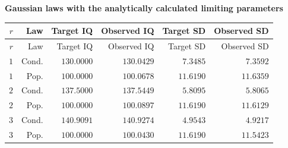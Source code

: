 
\begingroup\small
\setlength{\tabcolsep}{4pt}
\noindent\textbf{Gaussian laws with the analytically calculated limiting parameters}
\begin{longtable}{rrrrrr}
\toprule
$r$ & Law & Target IQ & Observed IQ & Target SD & Observed SD \\
\midrule
\endfirsthead
$r$ & Law & Target IQ & Observed IQ & Target SD & Observed SD \\
\midrule
\endhead
\bottomrule
\endfoot
$1$ & Cond. & $130.0000$ & $130.0429$ & $7.3485$ & $7.3592$ \\
$1$ & Pop. & $100.0000$ & $100.0678$ & $11.6190$ & $11.6359$ \\
$2$ & Cond. & $137.5000$ & $137.5449$ & $5.8095$ & $5.8065$ \\
$2$ & Pop. & $100.0000$ & $100.0897$ & $11.6190$ & $11.6129$ \\
$3$ & Cond. & $140.9091$ & $140.9274$ & $4.9543$ & $4.9217$ \\
$3$ & Pop. & $100.0000$ & $100.0430$ & $11.6190$ & $11.5423$ \\
\end{longtable}
\endgroup

